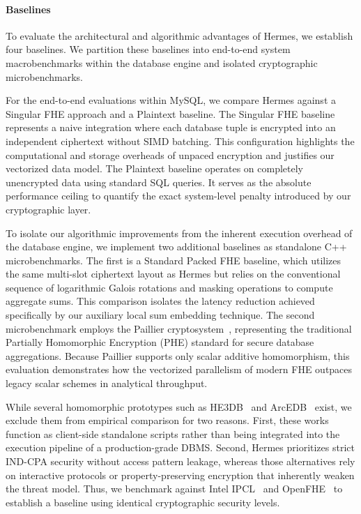 \documentclass[sigconf,nonacm]{acmart}
\begin{document}
\paragraph{Baselines}
To evaluate the architectural and algorithmic advantages of Hermes, we establish four baselines. We partition these baselines into end-to-end system macrobenchmarks within the database engine and isolated cryptographic microbenchmarks.

For the end-to-end evaluations within MySQL, we compare Hermes against a Singular FHE approach and a Plaintext baseline. The Singular FHE baseline represents a naive integration where each database tuple is encrypted into an independent ciphertext without SIMD batching. This configuration highlights the computational and storage overheads of unpaced encryption and justifies our vectorized data model. The Plaintext baseline operates on completely unencrypted data using standard SQL queries. It serves as the absolute performance ceiling to quantify the exact system-level penalty introduced by our cryptographic layer.

To isolate our algorithmic improvements from the inherent execution overhead of the database engine, we implement two additional baselines as standalone C++ microbenchmarks. The first is a Standard Packed FHE baseline, which utilizes the same multi-slot ciphertext layout as Hermes but relies on the conventional sequence of logarithmic Galois rotations and masking operations to compute aggregate sums. This comparison isolates the latency reduction achieved specifically by our auxiliary local sum embedding technique. The second microbenchmark employs the Paillier cryptosystem~\cite{paillier1999}, representing the traditional Partially Homomorphic Encryption (PHE) standard for secure database aggregations. Because Paillier supports only scalar additive homomorphism, this evaluation demonstrates how the vectorized parallelism of modern FHE outpaces legacy scalar schemes in analytical throughput.

While several homomorphic prototypes such as HE3DB~\cite{10.1145/3576915.3616608} and ArcEDB~\cite{10.1145/3658644.3670384} exist, we exclude them from empirical comparison for two reasons. First, these works function as client-side standalone scripts rather than being integrated into the execution pipeline of a production-grade DBMS. Second, Hermes prioritizes strict IND-CPA security without access pattern leakage, whereas those alternatives rely on interactive protocols or property-preserving encryption that inherently weaken the threat model. Thus, we benchmark against Intel IPCL~\cite{ipcl_github} and OpenFHE~\cite{openfhe} to establish a baseline using identical cryptographic security levels.
\end{document}
